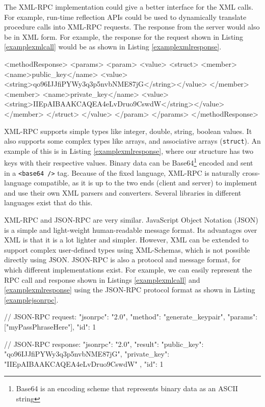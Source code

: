 The XML-RPC implementation could give a better interface for the XML calls. For example, run-time reflection APIs could be used to dynamically translate procedure calls into XML-RPC requests. The response from the server would also be in XML form. For example, the response for the request shown in Listing \ref{examplexmlcall} would be as shown in Listing \ref{examplexmlresponse}.

\begin{code}
<methodResponse>
  <params>
    <param>
        <value>
          <struct>
            <member>
              <name>public_key</name>
              <value><string>qo96IJJfiPYWy3q3p5nvbNME87jG</string></value>
            </member>
            <member>
              <name>private_key</name>
              <value><string>IIEpAIBAAKCAQEA4eLvDruo9CswdW</string></value>
            </member>
          </struct>
        </value>
    </param>
  </params>
</methodResponse>
\end{code}

XML-RPC supports simple types like integer, double, string, boolean values. It also supports some complex types like arrays, and associative arrays (\lstinline{struct}). An example of this is in Listing \ref{examplexmlresponse}, where our structure has two keys with their respective values. Binary data can be Base64\footnote{Base64 is an encoding scheme that represents binary data as an ASCII string} encoded and sent in a \lstinline{<base64 />} tag. Because of the fixed language, XML-RPC is naturally cross-language compatible, as it is up to the two ends (client and server) to implement and use their own XML parsers and converters. Several libraries in different languages exist that do this.

XML-RPC and JSON-RPC are very similar. JavaScript Object Notation (JSON) is a simple and light-weight human-readable message format. Its advantages over XML is that it is a lot lighter and simpler. However, XML can be extended to support complex user-defined types using XML-Schemas, which is not possible directly using JSON. JSON-RPC is also a protocol and message format, for which different implementations exist. For example, we can easily represent the RPC call and response shown in Listings \ref{examplexmlcall} and \ref{examplexmlresponse} using the JSON-RPC protocol format as shown in Listing \ref{examplejsonrpc}.
\\

\begin{code}
// JSON-RPC request:
{ 
  "jsonrpc": "2.0", 
  "method": "generate_keypair", 
  "params": ["myPassPhraseHere"], 
  "id": 1
}


// JSON-RPC response:
{
  "jsonrpc": "2.0", 
  "result": {
    "public_key": "qo96IJJfiPYWy3q3p5nvbNME87jG",
    "private_key": "IIEpAIBAAKCAQEA4eLvDruo9CswdW"
  }, 
  "id": 1
}

\end{code}

